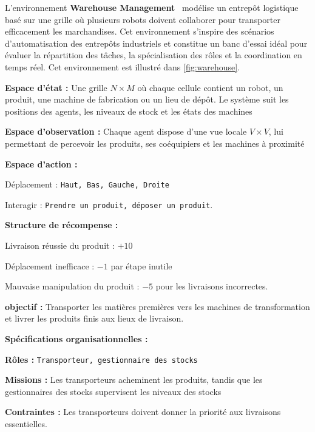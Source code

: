 L'environnement \textbf{Warehouse Management}~\cite{warehouse_management} modélise un entrepôt logistique basé sur une grille où plusieurs robots doivent collaborer pour transporter efficacement les marchandises. Cet environnement s'inspire des scénarios d'automatisation des entrepôts industriels et constitue un banc d'essai idéal pour évaluer la répartition des tâches, la spécialisation des rôles et la coordination en temps réel. Cet environnement est illustré dans \autoref{fig:warehouse}.
%
\begin{enumerate*}[label={\roman*)}, itemjoin={; \quad}]
  \item \textbf{Espace d'état :} Une grille $N \times M$ où chaque cellule contient un robot, un produit, une machine de fabrication ou un lieu de dépôt. Le système suit les positions des agents, les niveaux de stock et les états des machines
  \item \textbf{Espace d'observation :} Chaque agent dispose d'une vue locale $V \times V$, lui permettant de percevoir les produits, ses coéquipiers et les machines à proximité
  \item \textbf{Espace d'action :}
  \begin{enumerate*}[label={\roman*)}, itemjoin={; \quad}]
    \item Déplacement : \texttt{Haut, Bas, Gauche, Droite}
    \item Interagir : \texttt{Prendre un produit, déposer un produit}.
  \end{enumerate*}
  \item \textbf{Structure de récompense :}
  \begin{enumerate*}[label={\roman*)}, itemjoin={; \quad}]
    \item Livraison réussie du produit : $+10$
    \item Déplacement inefficace : $-1$ par étape inutile
    \item Mauvaise manipulation du produit : $-5$ pour les livraisons incorrectes.
  \end{enumerate*}
  \item \textbf{objectif :} Transporter les matières premières vers les machines de transformation et livrer les produits finis aux lieux de livraison.
\end{enumerate*}
%
\textbf{Spécifications organisationnelles :}
\begin{enumerate*}[label={\roman*)}, itemjoin={; \quad}]
  \item \textbf{Rôles :} \texttt{Transporteur, gestionnaire des stocks}
  \item \textbf{Missions :} Les transporteurs acheminent les produits, tandis que les gestionnaires des stocks supervisent les niveaux des stocks
  \item \textbf{Contraintes :} Les transporteurs doivent donner la priorité aux livraisons essentielles.
\end{enumerate*}

